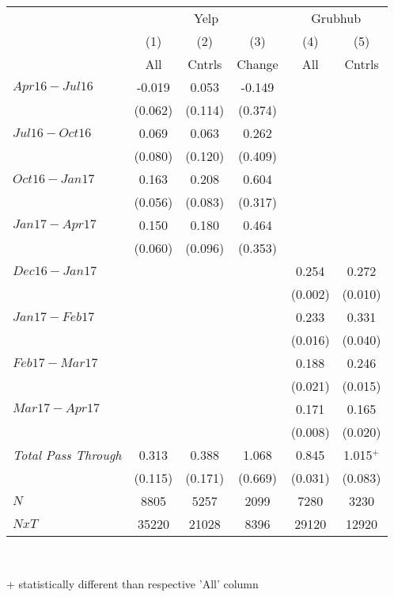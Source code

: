 \begin{center}
\begin{tabular}{lccccc}
\hline  & \multicolumn{3}{c}{Yelp} & \multicolumn{2}{c}{Grubhub}\\
 & (1) & (2) & (3) & (4) & (5)\\
 & All & Cntrls & Change & All & Cntrls\\
\hline  $ Apr16-Jul16 $  & -0.019 & 0.053 & -0.149 &  & \\
 & (0.062) & (0.114) & (0.374) &  & \\
 $ Jul16-Oct16 $  & 0.069 & 0.063 & 0.262 &  & \\
 & (0.080) & (0.120) & (0.409) &  & \\
 $ Oct16-Jan17 $  & 0.163 & 0.208 & 0.604 &  & \\
 & (0.056) & (0.083) & (0.317) &  & \\
 $ Jan17-Apr17 $  & 0.150 & 0.180 & 0.464 &  & \\
 & (0.060) & (0.096) & (0.353) &  & \\
\hline  $ Dec16-Jan17 $  &  &  &  & 0.254 & 0.272\\
 &  &  &  & (0.002) & (0.010)\\
 $ Jan17-Feb17 $  &  &  &  & 0.233 & 0.331\\
 &  &  &  & (0.016) & (0.040)\\
 $ Feb17-Mar17 $  &  &  &  & 0.188 & 0.246\\
 &  &  &  & (0.021) & (0.015)\\
 $ Mar17-Apr17 $  &  &  &  & 0.171 & 0.165\\
 &  &  &  & (0.008) & (0.020)\\
\hline \textit{Total Pass Through} & 0.313 & 0.388 & 1.068 & 0.845 & 1.015$^+$\\
  & (0.115) & (0.171) & (0.669) & (0.031) & (0.083)\\
\hline  $ N $  & 8805 & 5257 & 2099 & 7280 & 3230\\
 $ NxT $  & 35220 & 21028 & 8396 & 29120 & 12920\\
\hline\end{tabular}\\
\begin{tiny}+ statistically different than respective 'All' column \end{tiny}\\
\end{center}
